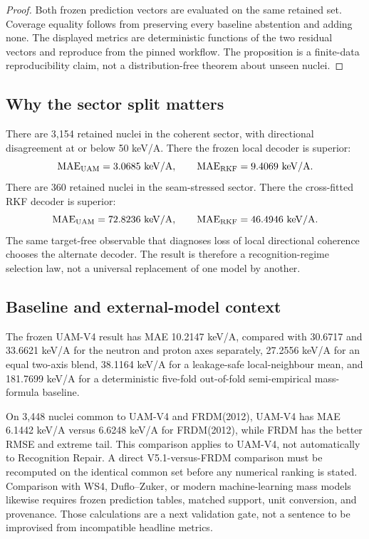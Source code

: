 \begin{proof}
Both frozen prediction vectors are evaluated on the same retained set. Coverage equality follows from preserving every baseline abstention and adding none. The displayed metrics are deterministic functions of the two residual vectors and reproduce from the pinned workflow. The proposition is a finite-data reproducibility claim, not a distribution-free theorem about unseen nuclei.
\end{proof}

\subsection{Why the sector split matters}

There are 3,154 retained nuclei in the coherent sector, with directional disagreement at or below 50 keV/A. There the frozen local decoder is superior:
\[
 \mathrm{MAE}_{\mathrm{UAM}}=3.0685\ \mathrm{keV/A},
 \qquad
 \mathrm{MAE}_{\mathrm{RKF}}=9.4069\ \mathrm{keV/A}.
\]
There are 360 retained nuclei in the seam-stressed sector. There the cross-fitted RKF decoder is superior:
\[
 \mathrm{MAE}_{\mathrm{UAM}}=72.8236\ \mathrm{keV/A},
 \qquad
 \mathrm{MAE}_{\mathrm{RKF}}=46.4946\ \mathrm{keV/A}.
\]
The same target-free observable that diagnoses loss of local directional coherence chooses the alternate decoder. The result is therefore a recognition-regime selection law, not a universal replacement of one model by another.

\subsection{Baseline and external-model context}

The frozen UAM-V4 result has MAE 10.2147 keV/A, compared with 30.6717 and 33.6621 keV/A for the neutron and proton axes separately, 27.2556 keV/A for an equal two-axis blend, 38.1164 keV/A for a leakage-safe local-neighbour mean, and 181.7699 keV/A for a deterministic five-fold out-of-fold semi-empirical mass-formula baseline.

On 3,448 nuclei common to UAM-V4 and FRDM(2012), UAM-V4 has MAE 6.1442 keV/A versus 6.6248 keV/A for FRDM(2012), while FRDM has the better RMSE and extreme tail. This comparison applies to UAM-V4, not automatically to Recognition Repair. A direct V5.1-versus-FRDM comparison must be recomputed on the identical common set before any numerical ranking is stated. Comparison with WS4, Duflo--Zuker, or modern machine-learning mass models likewise requires frozen prediction tables, matched support, unit conversion, and provenance. Those calculations are a next validation gate, not a sentence to be improvised from incompatible headline metrics.

